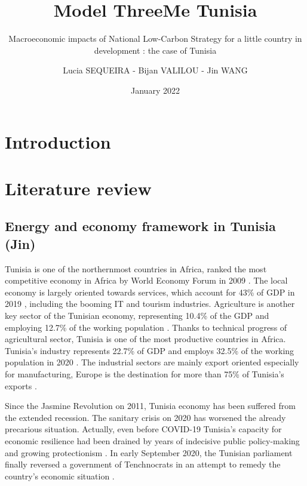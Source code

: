 \documentclass[
]{article}
\title{Model ThreeMe Tunisia}
\subtitle{Macroeconomic impacts of National Low-Carbon Strategy for a
little country in development : the case of Tunisia}
\author{Lucia SEQUEIRA - Bijan VALILOU - Jin WANG}
\date{January 2022}
\begin{document}
\maketitle

{
\setcounter{tocdepth}{4}
\tableofcontents
}
\newpage

\hypertarget{introduction}{%
\section{Introduction}\label{introduction}}

\hypertarget{literature-review}{%
\section{Literature review}\label{literature-review}}

\hypertarget{energy-and-economy-framework-in-tunisia-jin}{%
\subsection{Energy and economy framework in Tunisia
(Jin)}\label{energy-and-economy-framework-in-tunisia-jin}}

Tunisia is one of the northernmost countries in Africa, ranked the most
competitive economy in Africa by World Economy Forum in 2009
\autocite{tunisia2022}. The local economy is largely oriented towards
services, which account for 43\% of GDP in 2019
\autocite{worldbank2020}, including the booming IT and tourism
industries. Agriculture is another key sector of the Tunisian economy,
representing 10.4\% of the GDP and employing 12.7\% of the working
population \autocite{worldbank2020}. Thanks to technical progress of
agricultural sector, Tunisia is one of the most productive countries in
Africa. Tunisia's industry represents 22.7\% of GDP and employs 32.5\%
of the working population in 2020 \autocite{bnpparibas}. The industrial
sectors are mainly export oriented especially for manufacturing, Europe
is the destination for more than 75\% of Tunisia's exports
\autocite{worldbank2020}.

Since the Jasmine Revolution on 2011, Tunisia economy has been suffered
from the extended recession. The sanitary crisis on 2020 has worsened
the already precarious situation. Actually, even before COVID-19
Tunisia's capacity for economic resilience had been drained by years of
indecisive public policy-making and growing protectionism
\autocite{worldbank}. In early September 2020, the Tunisian parliament
finally reversed a government of Tenchnocrats in an attempt to remedy
the country's economic situation \autocite{bnpparibas}.
\end{document}
